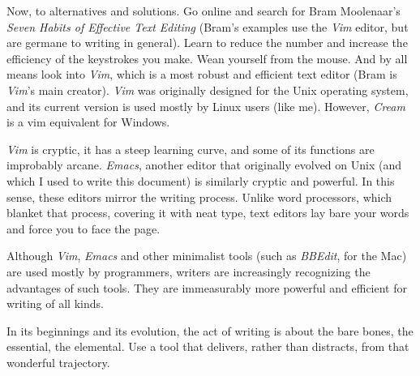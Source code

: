 \documentclass[letterpaper,10pt,headsepline]{scrreprt}
\begin{document}
Now, to alternatives and solutions. Go online and search for Bram
Moolenaar's \textit{Seven Habits of Effective Text Editing\/} (Bram's
examples use the \textit{Vim\/} editor, but are germane to writing in
general). Learn to reduce the number and increase the efficiency of
the keystrokes you make. Wean yourself from the mouse. And by all
means look into \textit{Vim}, which is a most robust and efficient
text editor (Bram is \textit{Vim\/}'s main creator). \textit{Vim\/} was
originally designed for the Unix operating system, and its current
version is used mostly by Linux users (like me). However,
\textit{Cream\/} is a vim equivalent for Windows.

\textit{Vim\/} is cryptic, it has a steep learning curve, and some of
its functions are improbably arcane. \textit{Emacs}, another editor
that originally evolved on Unix (and which I used to write this
document) is similarly cryptic and powerful. In this sense, these
editors mirror the writing process. Unlike word processors, which
blanket that process, covering it with neat type, text editors lay
bare your words and force you to face the page.

Although \textit{Vim}, \textit{Emacs\/} and other minimalist tools (such
as \textit{BBEdit}, for the Mac) are used mostly by programmers,
writers are increasingly recognizing the advantages of such tools.
They are immeasurably more powerful and efficient for writing of all
kinds.

In its beginnings and its evolution, the act of writing is about the
bare bones, the essential, the elemental. Use a tool that delivers,
rather than distracts, from that wonderful trajectory. 

\newpage
\end{document}
